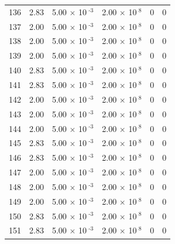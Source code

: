 \documentclass[a4paper,11pt]{article}
\begin{document}
\begin{center}
\begin{longtable}{|R{1.5cm}|R{2.4cm}|R{2.4cm}|R{2.4cm}|R{2.4cm}|R{2.4cm}|}
  136 &   2.83  &         5.00 $\times$ 10$^{\text{          -3}}$  &         2.00 $\times$ 10$^{\text{           8}}$  & 0  & 0 \\
  137 &   2.00  &         5.00 $\times$ 10$^{\text{          -3}}$  &         2.00 $\times$ 10$^{\text{           8}}$  & 0  & 0 \\
  138 &   2.00  &         5.00 $\times$ 10$^{\text{          -3}}$  &         2.00 $\times$ 10$^{\text{           8}}$  & 0  & 0 \\
  139 &   2.00  &         5.00 $\times$ 10$^{\text{          -3}}$  &         2.00 $\times$ 10$^{\text{           8}}$  & 0  & 0 \\
  140 &   2.83  &         5.00 $\times$ 10$^{\text{          -3}}$  &         2.00 $\times$ 10$^{\text{           8}}$  & 0  & 0 \\
  141 &   2.83  &         5.00 $\times$ 10$^{\text{          -3}}$  &         2.00 $\times$ 10$^{\text{           8}}$  & 0  & 0 \\
  142 &   2.00  &         5.00 $\times$ 10$^{\text{          -3}}$  &         2.00 $\times$ 10$^{\text{           8}}$  & 0  & 0 \\
  143 &   2.00  &         5.00 $\times$ 10$^{\text{          -3}}$  &         2.00 $\times$ 10$^{\text{           8}}$  & 0  & 0 \\
  144 &   2.00  &         5.00 $\times$ 10$^{\text{          -3}}$  &         2.00 $\times$ 10$^{\text{           8}}$  & 0  & 0 \\
  145 &   2.83  &         5.00 $\times$ 10$^{\text{          -3}}$  &         2.00 $\times$ 10$^{\text{           8}}$  & 0  & 0 \\
  146 &   2.83  &         5.00 $\times$ 10$^{\text{          -3}}$  &         2.00 $\times$ 10$^{\text{           8}}$  & 0  & 0 \\
  147 &   2.00  &         5.00 $\times$ 10$^{\text{          -3}}$  &         2.00 $\times$ 10$^{\text{           8}}$  & 0  & 0 \\
  148 &   2.00  &         5.00 $\times$ 10$^{\text{          -3}}$  &         2.00 $\times$ 10$^{\text{           8}}$  & 0  & 0 \\
  149 &   2.00  &         5.00 $\times$ 10$^{\text{          -3}}$  &         2.00 $\times$ 10$^{\text{           8}}$  & 0  & 0 \\
  150 &   2.83  &         5.00 $\times$ 10$^{\text{          -3}}$  &         2.00 $\times$ 10$^{\text{           8}}$  & 0  & 0 \\
  151 &   2.83  &         5.00 $\times$ 10$^{\text{          -3}}$  &         2.00 $\times$ 10$^{\text{           8}}$  & 0  & 0 \\

\end{longtable}
\end{center}
\end{document}
